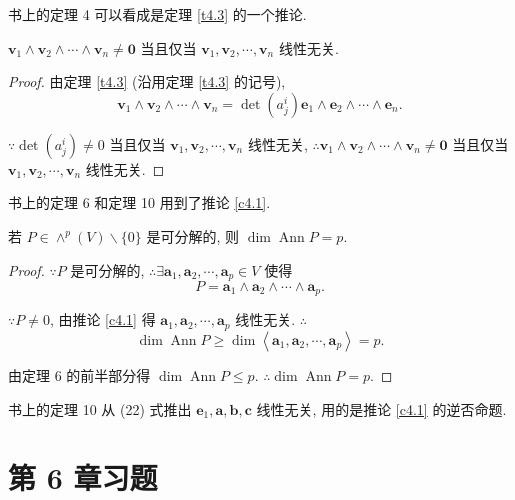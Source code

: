 \documentclass{ctexart}
\begin{document}
书上的定理 4 可以看成是定理 \ref{t4.3} 的一个推论.
\begin{corollary}[书上的定理 4]\label{c4.1}
    $\boldsymbol{v}_1\wedge\boldsymbol{v}_2\wedge\cdots\wedge\boldsymbol{v}_n\neq\boldsymbol{0}$ 当且仅当 $\boldsymbol{v}_1,\boldsymbol{v}_2,\cdots,\boldsymbol{v}_n$ 线性无关.
\end{corollary}
\begin{proof}
    由定理 \ref{t4.3} (沿用定理 \ref{t4.3} 的记号),
    \[\boldsymbol{v}_1\wedge\boldsymbol{v}_2\wedge\cdots\wedge\boldsymbol{v}_n=\operatorname{det}(a_j^i)\boldsymbol{e}_1\wedge\boldsymbol{e}_2\wedge\cdots\wedge\boldsymbol{e}_n.\]

    $\because\operatorname{det}(a_j^i)\neq0$ 当且仅当 $\boldsymbol{v}_1,\boldsymbol{v}_2,\cdots,\boldsymbol{v}_n$ 线性无关, $\therefore\boldsymbol{v}_1\wedge\boldsymbol{v}_2\wedge\cdots\wedge\boldsymbol{v}_n\neq\boldsymbol{0}$ 当且仅当 $\boldsymbol{v}_1,\boldsymbol{v}_2,\cdots,\boldsymbol{v}_n$ 线性无关.
\end{proof}

书上的定理 6 和定理 10 用到了推论 \ref{c4.1}.
\begin{theorem}
    若 $P\in\wedge^p(V)\backslash\{0\}$ 是可分解的, 则 $\dim\operatorname{Ann}P=p$.
\end{theorem}
\begin{proof}
    $\because P$ 是可分解的, $\therefore\exists\boldsymbol{a}_1,\boldsymbol{a}_2,\cdots,\boldsymbol{a}_p\in V$ 使得
    \[P=\boldsymbol{a}_1\wedge\boldsymbol{a}_2\wedge\cdots\wedge\boldsymbol{a}_p.\]

    $\because P\neq0$, 由推论 \ref{c4.1} 得 $\boldsymbol{a}_1,\boldsymbol{a}_2,\cdots,\boldsymbol{a}_p$ 线性无关. $\therefore$
    \[\dim\operatorname{Ann}P\geq\dim\left<\boldsymbol{a}_1,\boldsymbol{a}_2,\cdots,\boldsymbol{a}_p\right>=p.\]

    由定理 6 的前半部分得 $\dim\operatorname{Ann}P\leq p$. $\therefore\dim\operatorname{Ann}P=p$.
\end{proof}

书上的定理 10 从 (22) 式推出 $\boldsymbol{e}_1,\boldsymbol{a},\boldsymbol{b},\boldsymbol{c}$ 线性无关, 用的是推论 \ref{c4.1} 的逆否命题.
\section{第 6 章习题}
\end{document}

